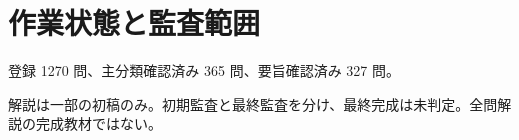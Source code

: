 \chapter{作業状態と監査範囲}
登録 1270 問、主分類確認済み 365 問、要旨確認済み 327 問。
\par 解説は一部の初稿のみ。初期監査と最終監査を分け、最終完成は未判定。全問解説の完成教材ではない。
